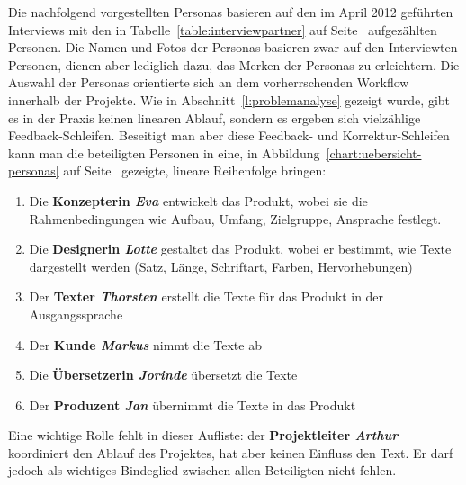 Die nachfolgend vorgestellten Personas basieren auf den im April 2012 geführten Interviews mit den in Tabelle~\ref{table:interviewpartner} auf Seite~\pageref{table:interviewpartner} aufgezählten Personen. Die Namen und Fotos der Personas basieren zwar auf den Interviewten Personen, dienen aber lediglich dazu, das Merken der Personas zu erleichtern. Die Auswahl der Personas orientierte sich an dem vorherrschenden Workflow innerhalb der Projekte. Wie in Abschnitt~\ref{l:problemanalyse} gezeigt wurde, gibt es in der Praxis keinen linearen Ablauf, sondern es ergeben sich vielzählige Feedback-Schleifen. Beseitigt man aber diese Feedback- und Korrektur-Schleifen kann man die beteiligten Personen in eine, in Abbildung~\ref{chart:uebersicht-personas} auf Seite~\pageref{chart:uebersicht-personas} gezeigte, lineare Reihenfolge bringen:
\begin{enumerate}\itemsep -5pt
\item Die \textbf{Konzepterin \emph{Eva}} entwickelt das Produkt, wobei sie die Rahmenbedingungen wie Aufbau, Umfang, Zielgruppe, Ansprache festlegt. 
\item Die \textbf{Designerin \emph{Lotte}} gestaltet das Produkt, wobei er bestimmt, wie Texte dargestellt werden (Satz, Länge, Schriftart, Farben, Hervorhebungen)
\item Der \textbf{Texter \emph{Thorsten}} erstellt die Texte für das Produkt in der Ausgangssprache
\item Der \textbf{Kunde \emph{Markus}} nimmt die Texte ab
\item Die \textbf{Übersetzerin \emph{Jorinde}} übersetzt die Texte
\item Der \textbf{Produzent \emph{Jan}} übernimmt die Texte in das Produkt
\end{enumerate}

Eine wichtige Rolle fehlt in dieser Aufliste: der \textbf{Projektleiter \emph{Arthur}} koordiniert den Ablauf des Projektes, hat aber keinen Einfluss den Text. Er darf jedoch als wichtiges Bindeglied zwischen allen Beteiligten  nicht fehlen.

